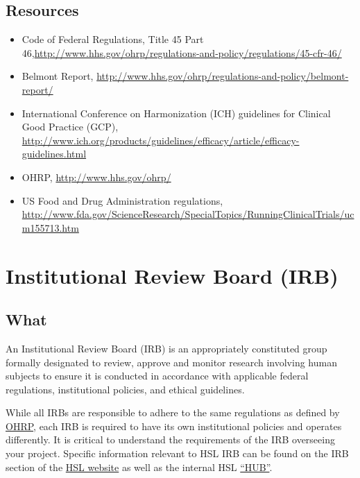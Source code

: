 \documentclass[]{book}
\providecommand{\tightlist}{%
  \setlength{\itemsep}{0pt}\setlength{\parskip}{0pt}}
\theoremstyle{definition}
\theoremstyle{definition}
\theoremstyle{definition}
\theoremstyle{remark}
\begin{document}
\subsection{Resources}\label{resources-3}

\begin{itemize}
\tightlist
\item
  Code of Federal Regulations, Title 45 Part
  46,\url{http://www.hhs.gov/ohrp/regulations-and-policy/regulations/45-cfr-46/}
\item
  Belmont Report,
  \url{http://www.hhs.gov/ohrp/regulations-and-policy/belmont-report/}
\item
  International Conference on Harmonization (ICH) guidelines for
  Clinical Good Practice (GCP),
  \url{http://www.ich.org/products/guidelines/efficacy/article/efficacy-guidelines.html}
\item
  OHRP, \url{http://www.hhs.gov/ohrp/}
\item
  US Food and Drug Administration regulations,
  \url{http://www.fda.gov/ScienceResearch/SpecialTopics/RunningClinicalTrials/ucm155713.htm}
\end{itemize}

\section{Institutional Review Board
(IRB)}\label{institutional-review-board-irb}

\subsection{What}\label{what-5}

An Institutional Review Board (IRB) is an appropriately constituted
group formally designated to review, approve and monitor research
involving human subjects to ensure it is conducted in accordance with
applicable federal regulations, institutional policies, and ethical
guidelines.

While all IRBs are responsible to adhere to the same regulations as
defined by \href{http://www.hhs.gov/ohrp/regulations-and-policy}{OHRP},
each IRB is required to have its own institutional policies and operates
differently. It is critical to understand the requirements of the IRB
overseeing your project. Specific information relevant to HSL IRB can be
found on the IRB section of the
\href{http://www.instituteforagingresearch.org/resources/research-administration/institutional-review-board}{HSL
website} as well as the internal HSL
\href{http://thehslhub/Departments/Roslindale/HSL-IFAR/Institutional-Review-Board}{``HUB''}.
\end{document}
